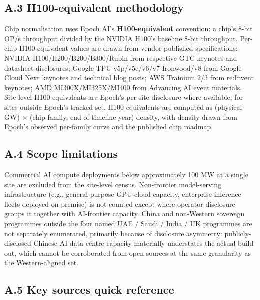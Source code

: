 \documentclass[11pt,a4paper]{article}
\begin{document}
\subsection*{A.3 H100-equivalent methodology}

Chip normalisation uses Epoch AI's \textbf{H100-equivalent} convention: a chip's 8-bit OP/s throughput divided by the NVIDIA H100's baseline 8-bit throughput. Per-chip H100-equivalent values are drawn from vendor-published specifications: NVIDIA H100/H200/B200/B300/Rubin from respective GTC keynotes and datasheet disclosures; Google TPU v5p/v5e/v6/v7 Ironwood/v8 from Google Cloud Next keynotes and technical blog posts; AWS Trainium 2/3 from re:Invent keynotes; AMD MI300X/MI325X/MI400 from Advancing AI event materials. Site-level H100-equivalents are Epoch's per-site disclosure where available; for sites outside Epoch's tracked set, H100-equivalents are computed as (physical-GW) $\times$ (chip-family, end-of-timeline-year) density, with density drawn from Epoch's observed per-family curve and the published chip roadmap.

\subsection*{A.4 Scope limitations}

Commercial AI compute deployments below approximately 100 MW at a single site are excluded from the site-level census. Non-frontier model-serving infrastructure (e.g., general-purpose GPU cloud capacity, enterprise inference fleets deployed on-premise) is not counted except where operator disclosure groups it together with AI-frontier capacity. China and non-Western sovereign programmes outside the four named UAE / Saudi / India / UK programmes are not separately enumerated, primarily because of disclosure asymmetry: publicly-disclosed Chinese AI data-centre capacity materially understates the actual build-out, which cannot be corroborated from open sources at the same granularity as the Western-aligned set.

\subsection*{A.5 Key sources quick reference}
\end{document}
